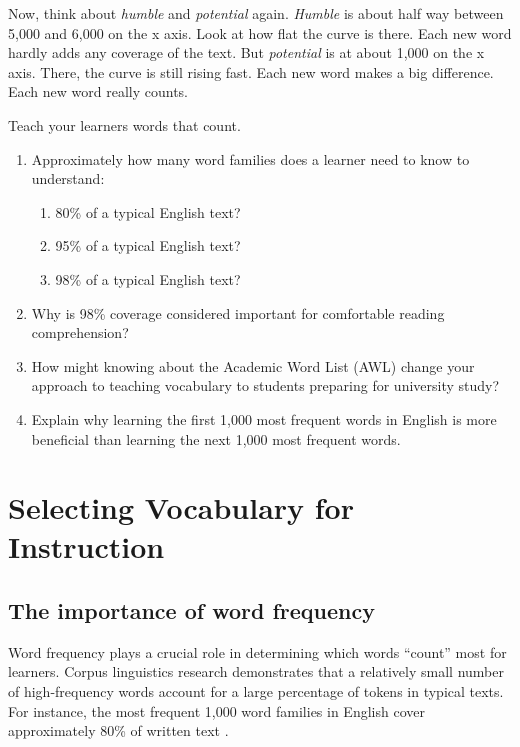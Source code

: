 Now, think about \textit{humble} and \textit{potential} again. \textit{Humble} is about half way between 5,000 and 6,000 on the x axis. Look at how flat the curve is there. Each new word hardly adds any coverage of the text. But \textit{potential} is at about 1,000 on the x axis. There, the curve is still rising fast. Each new word makes a big difference. Each new word really counts.

Teach your learners words that count.

\begin{tcolorbox}[title=Exercise: Vocabulary Size and Coverage, colback=white, colframe=purple!75!black, fonttitle=\bfseries]
\begin{enumerate}[nosep]
    \item Approximately how many word families does a learner need to know to understand:
       \begin{enumerate}[nosep]
          \item 80\% of a typical English text?
          \item 95\% of a typical English text?
          \item 98\% of a typical English text?
       \end{enumerate}

    \item Why is 98\% coverage considered important for comfortable reading comprehension?

    \item How might knowing about the Academic Word List (AWL) change your approach to teaching vocabulary to students preparing for university study?

    \item Explain why learning the first 1,000 most frequent words in English is more beneficial than learning the next 1,000 most frequent words.
\end{enumerate}
\end{tcolorbox}

\section{Selecting Vocabulary for Instruction} \label{sec:selecting-vocab}
\subsection*{The importance of word frequency}

Word frequency plays a crucial role in determining which words ``count'' most for learners. Corpus linguistics research demonstrates that a relatively small number of high-frequency words account for a large percentage of tokens in typical texts. For instance, the most frequent 1,000 word families in English cover approximately 80\% of written text \citep{Nation2022}.

